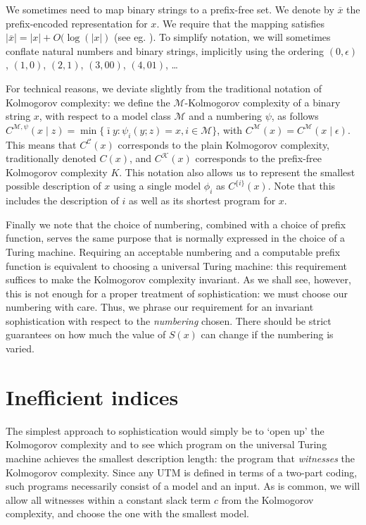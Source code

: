 \documentclass{style/llncs}
\newcommand{\M}{\mathscr M}
\newcommand{\C}{\mathscr C}
\newcommand{\K}{\mathscr K}
\newcommand{\br}[1]{\overline{#1}}
\begin{document}
We sometimes need to map binary strings to a prefix-free set. We denote by $\br{x}$ the prefix-encoded representation for $x$. We require that the mapping satisfies $|\br{x}| = |x|+O(\log(|x|)$ (see eg. \cite[Section~1.4]{li1993introduction}). To simplify notation, we will sometimes conflate natural numbers and binary strings, implicitly using the ordering $(0, \epsilon)$, $(1, 0)$, $(2, 1)$, $(3, 00)$, $(4, 01)$, \ldots  

For technical reasons, we deviate slightly from the traditional notation of Kolmogorov complexity: we define the $\M$-Kolmogorov complexity of a binary string $x$, with respect to a model class $\M$ and a numbering $\psi$, as follows $C^{\M,\psi}(x\mid z)=\min\{\bar\imath y:\psi_i(y; z)=x,i\in\M\}$, with $C^\M(x) = C^\M(x\mid \epsilon)$. This means that $C^\C(x)$ corresponds to the plain Kolmogorov complexity, traditionally denoted $C(x)$, and $C^\K(x)$ corresponds to the prefix-free Kolmogorov complexity $K$. This notation also allows us to represent the smallest possible description of $x$ using a single model $\phi_i$ as $C^{\{i\}}(x)$. Note that this includes the description of $i$ as well as its shortest program for $x$.

Finally we note that the choice of numbering, combined with a choice of prefix function, serves the same purpose that is normally expressed in the choice of a Turing machine. Requiring an acceptable numbering and a computable prefix function is equivalent to choosing a universal Turing machine: this requirement suffices to make the Kolmogorov complexity invariant. As we shall see, however, this is not enough for a proper treatment of sophistication: we must choose our numbering with care. Thus, we phrase our requirement for an invariant sophistication with respect to the \emph{numbering} chosen. There should be strict guarantees on how much the value of $S(x)$ can change if the numbering is varied.
 
\section{Inefficient indices}
\label{section:indices}

The simplest approach to sophistication would simply be to `open up' the Kolmogorov complexity and to see which program on the universal Turing machine achieves the smallest description length: the program that \emph{witnesses} the Kolmogorov complexity. Since any UTM is defined in terms of a two-part coding, such programs necessarily consist of a model and an input. As is common, we will allow all witnesses within a constant slack term $c$ from the Kolmogorov complexity, and choose the one with the smallest model.
\end{document}
